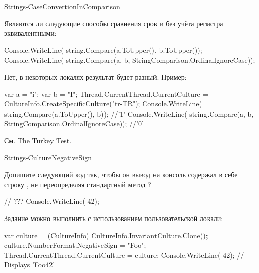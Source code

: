\begin{defproblem}{Strings-CaseConvertionInComparison}
\begin{onlyproblem}
  Являются ли следующие способы сравнения срок  и  без учёта регистра эквивалентными:
  \begin{source}
  Console.WriteLine(
    string.Compare(a.ToUpper(), b.ToUpper());
  Console.WriteLine(
    string.Compare(a, b, StringComparison.OrdinalIgnoreCase));
  \end{source}
\end{onlyproblem}
\begin{onlysolution}
  Нет, в некоторых локалях результат будет разный. Пример:
  \begin{source}
  var a = "i";
  var b = "I";
  Thread.CurrentThread.CurrentCulture = 
    CultureInfo.CreateSpecificCulture("tr-TR");
  Console.WriteLine(
    string.Compare(a.ToUpper(), b)); //'1'
  Console.WriteLine(
    string.Compare(a, b, StringComparison.OrdinalIgnoreCase)); //'0'
  \end{source}
  См. \href{http://www.moserware.com/2008/02/does-your-code-pass-turkey-test.html}{The Turkey Test}.
\end{onlysolution}
\end{defproblem}
\begin{defproblem}{Strings-CultureNegativeSign}
\begin{onlyproblem}
  Допишите следующий код так, чтобы он вывод на консоль содержал в себе строку , не переопределяя стандартный метод ?
  \begin{source}
  // ???
  Console.WriteLine(-42);
  \end{source}
\end{onlyproblem}
\begin{onlysolution}
  Задание можно выполнить с использованием пользовательской локали:
  \begin{source}
  var culture = (CultureInfo) CultureInfo.InvariantCulture.Clone();
  culture.NumberFormat.NegativeSign = "Foo";
  Thread.CurrentThread.CurrentCulture = culture;
  Console.WriteLine(-42); // Displays 'Foo42'
  \end{source}
\end{onlysolution}
\end{defproblem}
